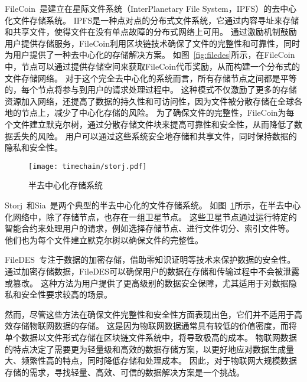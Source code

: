 FileCoin~\cite{bauer2022filecoin}是建立在星际文件系统（InterPlanetary File System，IPFS）的去中心化文件存储系统。
IPFS是一种点对点的分布式文件系统，它通过内容寻址来存储和共享文件，使得文件在没有单点故障的分布式网络上可用。
通过激励机制鼓励用户提供存储服务，FileCoin利用区块链技术确保了文件的完整性和可靠性，同时为用户提供了一种去中心化的存储解决方案。
如图~\ref{fig:filedes}所示，在FileCoin中，节点可以通过提供存储空间来获取FileCoin代币奖励，从而构建一个分布式的文件存储网络。
对于这个完全去中心化的系统而言，所有存储节点之间都是平等的，每个节点将参与到用户的请求处理过程中。
这种模式不仅激励了更多的存储资源加入网络，还提高了数据的持久性和可访问性，因为文件被分散存储在全球各地的节点上，减少了中心化存储的风险。
为了确保文件的完整性，FileCoin为每个文件建立默克尔树，通过分散存储文件块来提高可靠性和安全性，从而降低了数据丢失的风险。
用户可以通过这些系统安全地存储和共享文件，同时保持数据的隐私和安全性。

\begin{figure}[t]
    \centering
    \texttt{[image: timechain/storj.pdf]}
    \caption{半去中心化存储系统}
    \label{fig:storj}
\end{figure}

Storj~\cite{storj2018storj}和Sia~\cite{vorick2014sia}是两个典型的半去中心化的文件存储系统。
如图~\ref{fig:storj}所示，在半去中心化网络中，除了存储节点，也存在一组卫星节点。
这些卫星节点通过运行特定的智能合约来处理用户的请求，例如选择存储节点、进行文件切分、索引文件等。
他们也为每个文件建立默克尔树以确保文件的完整性。

FileDES~\cite{xu2024filedes}专注于数据的加密存储，借助零知识证明等技术来保护数据的安全性。
通过加密存储数据，FileDES可以确保用户的数据在存储和传输过程中不会被泄露或篡改。
这种方法为用户提供了更高级别的数据安全保障，尤其适用于对数据隐私和安全性要求较高的场景。

然而，尽管这些方法在确保文件完整性和安全性方面表现出色，它们并不适用于高效存储物联网数据的存储。
这是因为物联网数据通常具有较低的价值密度，而将单个数据以文件形式存储在区块链文件系统中，将导致极高的成本。
物联网数据的特点决定了需要更为轻量级和高效的数据存储方案，以更好地应对数据生成量大、频繁性高的特点，同时降低存储和处理成本。
因此，对于物联网大规模数据存储的需求，寻找轻量、高效、可信的数据解决方案是一个挑战。

